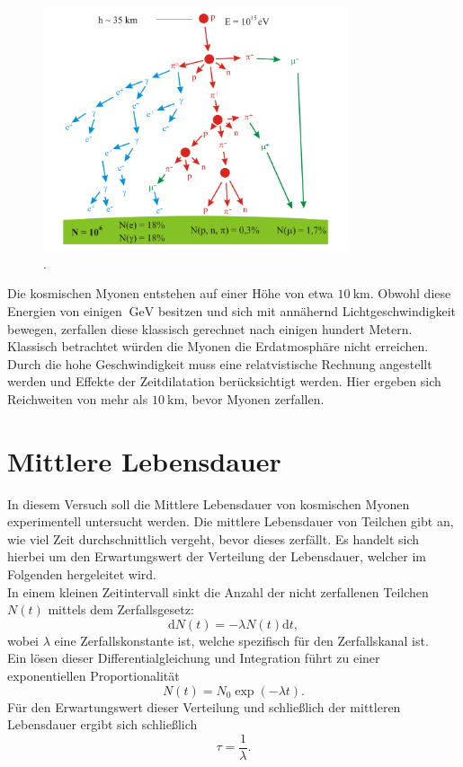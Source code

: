 \begin{figure}
    \centering
    \includegraphics[width = 0.8\textwidth]{pics/Teilchenkaskade.png}
    \caption{. \cite{WikiKaskade}}
    \label{fig:Teilchenshower}
\end{figure}
Die kosmischen Myonen entstehen auf einer Höhe von etwa $\qty{10}{\kilo\meter}$\cite{MyonenAachen}. Obwohl diese Energien von einigen $\qty{}{\giga\electronvolt}$ besitzen und sich mit annähernd Lichtgeschwindigkeit
bewegen, zerfallen diese klassisch gerechnet nach einigen hundert Metern. Klassisch betrachtet würden die Myonen die Erdatmosphäre nicht erreichen. Durch die hohe Geschwindigkeit
muss eine relatvistische Rechnung angestellt werden und Effekte der Zeitdilatation berücksichtigt werden. Hier ergeben sich Reichweiten von mehr als $\qty{10}{\kilo\meter}$, bevor Myonen zerfallen.\\

\section{Mittlere Lebensdauer}

In diesem Versuch soll die Mittlere Lebensdauer von kosmischen Myonen experimentell untersucht werden. Die mittlere Lebensdauer von Teilchen gibt an, wie viel Zeit durchschnittlich vergeht, bevor
dieses zerfällt. Es handelt sich hierbei um den Erwartungswert der Verteilung der Lebensdauer, welcher im Folgenden hergeleitet wird.\\
In einem kleinen Zeitintervall sinkt die Anzahl der nicht zerfallenen Teilchen $N(t)$ mittels dem Zerfallsgesetz:
\begin{equation}
    \mathrm{d}N(t) = - \lambda N(t) \mathrm{d}t,
\end{equation}
wobei $\lambda$ eine Zerfallskonstante ist, welche spezifisch für den Zerfallskanal ist.\\
Ein lösen dieser Differentialgleichung und Integration führt zu einer exponentiellen Proportionalität
\begin{equation}
    N(t) = N_0 \exp{(-\lambda t)}.
\end{equation}
Für den Erwartungswert dieser Verteilung und schließlich der mittleren Lebensdauer ergibt sich schließlich
\begin{equation}
    \tau = \frac{1}{\lambda}.
\end{equation}


